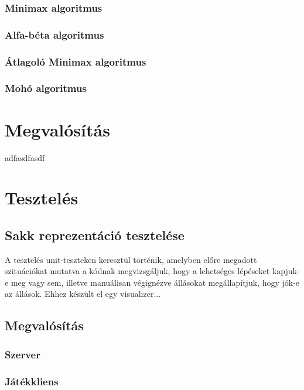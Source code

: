 \documentclass[twoside, a4paper, 12pt]{article}
\begin{document}
\subsubsection{Minimax algoritmus}
\lipsum[1]
\subsubsection{Alfa-béta algoritmus}
\lipsum[1]
\subsubsection{Átlagoló Minimax algoritmus}
\lipsum[1]
\subsubsection{Mohó algoritmus}
\lipsum[1]




\newpage
\section{Megvalósítás}
adfasdfasdf




\newpage
\section{Tesztelés}
\subsection{Sakk reprezentáció tesztelése}

A tesztelés unit-teszteken keresztül történik, amelyben előre megadott szituációkat mutatva a kódnak megvizsgáljuk, hogy a lehetséges lépéseket kapjuk-e meg vagy sem, illetve manuálisan végignézve állásokat megállapítjuk, hogy jók-e az állások. Ehhez készült el egy visualizer...











\subsection{Megvalósítás}
\subsubsection{Szerver}
\lipsum[1]

\subsubsection{Játékkliens}
\lipsum[2]
\end{document}
